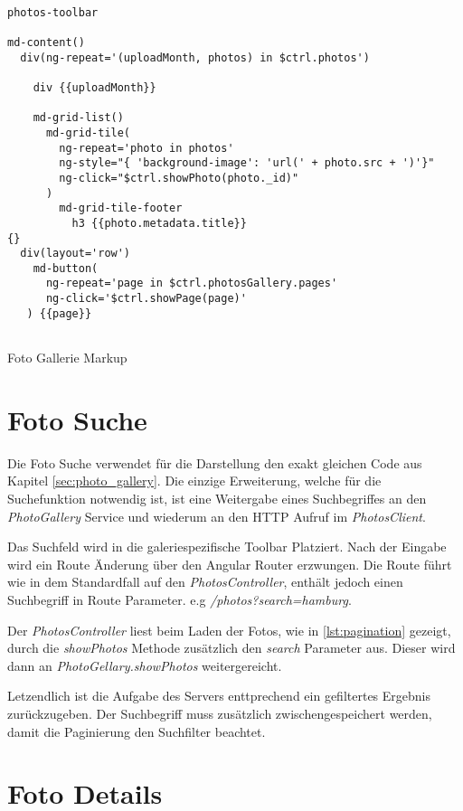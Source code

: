 \begin{listing}[H]
\begin{verbatim}

photos-toolbar

md-content()
  div(ng-repeat='(uploadMonth, photos) in $ctrl.photos')

    div {{uploadMonth}}

    md-grid-list()
      md-grid-tile(
        ng-repeat='photo in photos'
        ng-style="{ 'background-image': 'url(' + photo.src + ')'}"
        ng-click="$ctrl.showPhoto(photo._id)"
      )
        md-grid-tile-footer
          h3 {{photo.metadata.title}}
{}
  div(layout='row')
    md-button(
      ng-repeat='page in $ctrl.photosGallery.pages'
      ng-click='$ctrl.showPage(page)'
   ) {{page}}


\end{verbatim}
\caption{Foto Gallerie Markup}
\label{lst:photo_group_jade}
\end{listing} 

\section{Foto Suche}

Die Foto Suche verwendet für die Darstellung den exakt gleichen Code aus Kapitel \ref{sec:photo_gallery}. Die einzige Erweiterung, welche für die Suchefunktion notwendig ist, ist eine Weitergabe eines Suchbegriffes an den \textit{PhotoGallery} Service und wiederum an den HTTP Aufruf im \textit{PhotosClient}.

Das Suchfeld wird in die galeriespezifische Toolbar Platziert. Nach der Eingabe wird ein Route Änderung über den Angular Router erzwungen. Die Route führt wie in dem Standardfall auf den \textit{PhotosController}, enthält jedoch einen Suchbegriff in Route Parameter. e.g \textit{/photos?search=hamburg}. 

Der \textit{PhotosController} liest beim Laden der Fotos, wie in \ref{lst:pagination} gezeigt, durch die \textit{showPhotos} Methode zusätzlich den  
\textit{search} Parameter aus. Dieser wird dann an \textit{PhotoGellary.showPhotos} weitergereicht. 

Letzendlich ist die Aufgabe des Servers enttprechend ein gefiltertes Ergebnis zurückzugeben. Der Suchbegriff muss zusätzlich zwischengespeichert werden, damit die Paginierung den Suchfilter beachtet.

\section{Foto Details}
\label{sec:photo_details}

